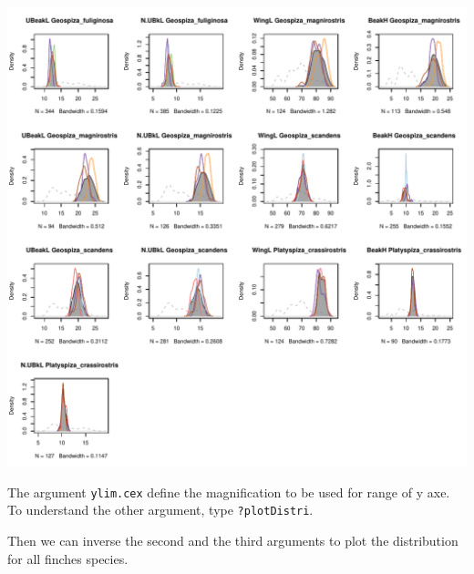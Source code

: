 \documentclass[12pt]{article}\usepackage[]{graphicx}\usepackage[]{color}
\makeatletter
\def\maxwidth{ %
  \ifdim\Gin@nat@width>\linewidth
    \linewidth
  \else
    \Gin@nat@width
  \fi
}
\newenvironment{knitrout}{}{} %
\makeatother
\begin{document}
\begin{knitrout}
\includegraphics[width=\maxwidth]{figure/unnamed-chunk-10-3} 

\end{knitrout}
The argument \texttt{ylim.cex} define the magnification to be used for range of y axe. To understand the other argument, type \texttt{?plotDistri}.

\newpage

Then we can inverse the second and the third arguments to plot the distribution for all finches species. 
\end{document}
